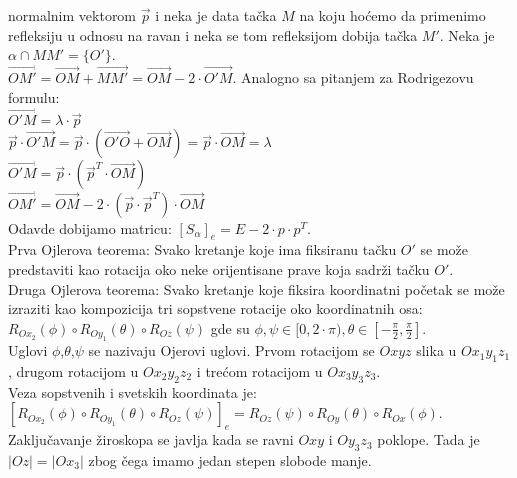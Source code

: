 \documentclass[12pt]{article}
\newcommand{\vek}[1]{\overrightarrow{#1}}
\begin{document}
    normalnim vektorom $\vek{p}$ i neka je data tačka $M$
    na koju hoćemo da primenimo refleksiju u odnosu na ravan i neka se
    tom refleksijom dobija tačka $M'$. Neka je $\alpha\cap MM'=\{O'\}$.\\
$\vek{OM'}=\vek{OM}+\vek{MM'}=\vek{OM}-2\cdot \vek{O'M}$.
    Analogno sa pitanjem za Rodrigezovu formulu:\\
$\vek{O'M}=\lambda\cdot\vek{p}$\\
$\vek{p}\cdot\vek{O'M}=\vek{p}\cdot(\vek{O'O}+\vek{OM})=\vek{p}\cdot\vek{OM}=\lambda$\\
$\vek{O'M}=\vek{p}\cdot (\vek{p}^T\cdot\vek{OM})$\\
$\vek{OM'}=\vek{OM}-2\cdot(\vek{p}\cdot \vek{p}^T)\cdot\vek{OM}$\\
    Odavde dobijamo matricu: $[S_\alpha]_e=E-2\cdot p\cdot p^T$.\\
    Prva Ojlerova teorema: Svako kretanje koje ima fiksiranu tačku
$O'$ se može predstaviti kao rotacija oko neke orijentisane
    prave koja sadrži tačku $O'$.\\
    Druga Ojlerova teorema: Svako kretanje koje fiksira koordinatni
    početak se može izraziti kao kompozicija tri sopstvene rotacije
    oko koordinatnih osa:\\
$R_{Ox_2}(\phi)\circ R_{Oy_1}(\theta)\circ R_{Oz}(\psi)$ gde su $\phi,\psi\in[0,2\cdot\pi),\theta\in[-\frac{\pi}{2},\frac{\pi}{2}]$.\\
        Uglovi $\phi$,$\theta$,$\psi$ se nazivaju Ojerovi uglovi. Prvom rotacijom se $Oxyz$ slika u $Ox_1y_1z_1$,
        drugom rotacijom u $Ox_2y_2z_2$ i trećom rotacijom u $Ox_3y_3z_3$.\\
        Veza sopstvenih i svetskih koordinata je:\\
    $[R_{Ox_2}(\phi)\circ R_{Oy_1}(\theta)\circ R_{Oz}(\psi)]_e = R_{Oz}(\psi)\circ R_{Oy}(\theta)\circ R_{Ox}(\phi)$.\\
        Zaključavanje žiroskopa se javlja kada se ravni $Oxy$ i $Oy_3z_3$ poklope. Tada
        je $|Oz|=|Ox_3|$ zbog čega imamo jedan stepen slobode manje.
    \par
\end{document}
